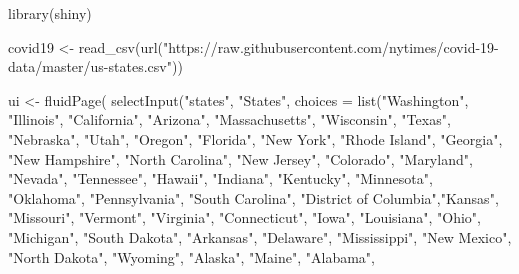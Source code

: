 \documentclass[
]{book}
\newenvironment{Shaded}{\begin{snugshade}}{\end{snugshade}}
\newcommand{\AttributeTok}[1]{\textcolor[rgb]{0.77,0.63,0.00}{#1}}
\newcommand{\FunctionTok}[1]{\textcolor[rgb]{0.00,0.00,0.00}{#1}}
\newcommand{\NormalTok}[1]{#1}
\newcommand{\OtherTok}[1]{\textcolor[rgb]{0.56,0.35,0.01}{#1}}
\newcommand{\StringTok}[1]{\textcolor[rgb]{0.31,0.60,0.02}{#1}}
\begin{document}
\begin{Shaded}
\begin{Highlighting}[]
\FunctionTok{library}\NormalTok{(shiny)}

\NormalTok{covid19 }\OtherTok{\textless{}{-}} \FunctionTok{read\_csv}\NormalTok{(}\FunctionTok{url}\NormalTok{(}\StringTok{"https://raw.githubusercontent.com/nytimes/covid{-}19{-}data/master/us{-}states.csv"}\NormalTok{))}

\NormalTok{ui }\OtherTok{\textless{}{-}} \FunctionTok{fluidPage}\NormalTok{(}
  \FunctionTok{selectInput}\NormalTok{(}\StringTok{"states"}\NormalTok{, }
              \StringTok{"States"}\NormalTok{, }
              \AttributeTok{choices =} \FunctionTok{list}\NormalTok{(}\StringTok{"Washington"}\NormalTok{, }\StringTok{"Illinois"}\NormalTok{, }\StringTok{"California"}\NormalTok{, }\StringTok{"Arizona"}\NormalTok{, }\StringTok{"Massachusetts"}\NormalTok{, }\StringTok{"Wisconsin"}\NormalTok{,                                        }\StringTok{"Texas"}\NormalTok{, }\StringTok{"Nebraska"}\NormalTok{, }\StringTok{"Utah"}\NormalTok{, }\StringTok{"Oregon"}\NormalTok{, }\StringTok{"Florida"}\NormalTok{, }\StringTok{"New York"}\NormalTok{,            }
                             \StringTok{"Rhode Island"}\NormalTok{, }\StringTok{"Georgia"}\NormalTok{, }\StringTok{"New Hampshire"}\NormalTok{, }\StringTok{"North Carolina"}\NormalTok{, }\StringTok{"New Jersey"}\NormalTok{, }\StringTok{"Colorado"}\NormalTok{,    }
                             \StringTok{"Maryland"}\NormalTok{, }\StringTok{"Nevada"}\NormalTok{, }\StringTok{"Tennessee"}\NormalTok{, }\StringTok{"Hawaii"}\NormalTok{, }\StringTok{"Indiana"}\NormalTok{, }\StringTok{"Kentucky"}\NormalTok{,                }
                             \StringTok{"Minnesota"}\NormalTok{, }\StringTok{"Oklahoma"}\NormalTok{, }\StringTok{"Pennsylvania"}\NormalTok{, }\StringTok{"South Carolina"}\NormalTok{, }\StringTok{"District of Columbia"}\NormalTok{,}\StringTok{"Kansas"}\NormalTok{,}
                             \StringTok{"Missouri"}\NormalTok{, }\StringTok{"Vermont"}\NormalTok{, }\StringTok{"Virginia"}\NormalTok{, }\StringTok{"Connecticut"}\NormalTok{, }\StringTok{"Iowa"}\NormalTok{, }\StringTok{"Louisiana"}\NormalTok{,               }
                             \StringTok{"Ohio"}\NormalTok{, }\StringTok{"Michigan"}\NormalTok{, }\StringTok{"South Dakota"}\NormalTok{, }\StringTok{"Arkansas"}\NormalTok{, }\StringTok{"Delaware"}\NormalTok{, }\StringTok{"Mississippi"}\NormalTok{,             }
                             \StringTok{"New Mexico"}\NormalTok{, }\StringTok{"North Dakota"}\NormalTok{, }\StringTok{"Wyoming"}\NormalTok{, }\StringTok{"Alaska"}\NormalTok{, }\StringTok{"Maine"}\NormalTok{, }\StringTok{"Alabama"}\NormalTok{,                 }

\end{Highlighting}
\end{Shaded}
\end{document}
